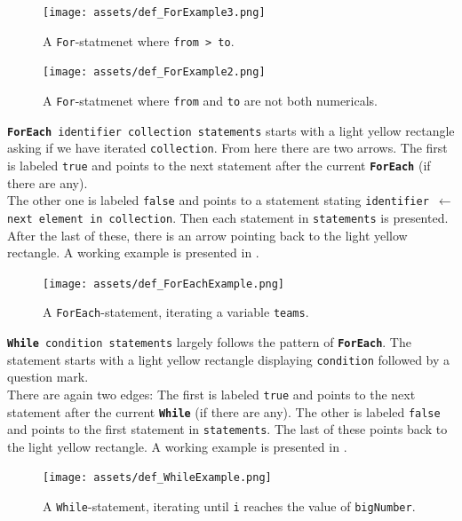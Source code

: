 \begin{figure}[ht]
    \centering
    \texttt{[image: assets/def\_ForExample3.png]}
    \caption{A \texttt{For}-statmenet where \texttt{from > to}.}
    \label{forExample2}
\end{figure}

\begin{figure}[ht!]
    \centering
    \texttt{[image: assets/def\_ForExample2.png]}
    \caption{A \texttt{For}-statmenet where \texttt{from} and \texttt{to} are not both numericals.}
    \label{forExample3}
\end{figure}

\texttt{\textbf{ForEach} identifier collection statements} starts with a light yellow rectangle asking if we have iterated \texttt{collection}. From here there are two arrows. The first is labeled \texttt{true} and points to the next statement after the current \texttt{\textbf{ForEach}} (if there are any). \\

The other one is labeled \texttt{false} and points to a statement stating \texttt{identifier $\gets$ next element in collection}. Then each statement in \texttt{statements} is presented. After the last of these, there is an arrow pointing back to the light yellow rectangle. A working example is presented in . \\

\begin{figure}[ht]
    \centering
    \texttt{[image: assets/def\_ForEachExample.png]}
    \caption{A \texttt{ForEach}-statement, iterating a variable \texttt{teams}.}
    \label{flochartForEach}
\end{figure}

\texttt{\textbf{While} condition statements} largely follows the pattern of \texttt{\textbf{ForEach}}. The statement starts with a light yellow rectangle displaying \texttt{condition} followed by a question mark. \\

There are again two edges: The first is labeled \texttt{true} and points to the next statement after the current \texttt{\textbf{While}} (if there are any). The other is labeled \texttt{false} and points to the first statement in \texttt{statements}. The last of these points back to the light yellow rectangle. A working example is presented in . \\

\begin{figure}[ht]
    \centering
    \texttt{[image: assets/def\_WhileExample.png]}
    \caption{A \texttt{While}-statement, iterating until \texttt{i} reaches the value of \texttt{bigNumber}.}
    \label{flochartWhile}
\end{figure}

